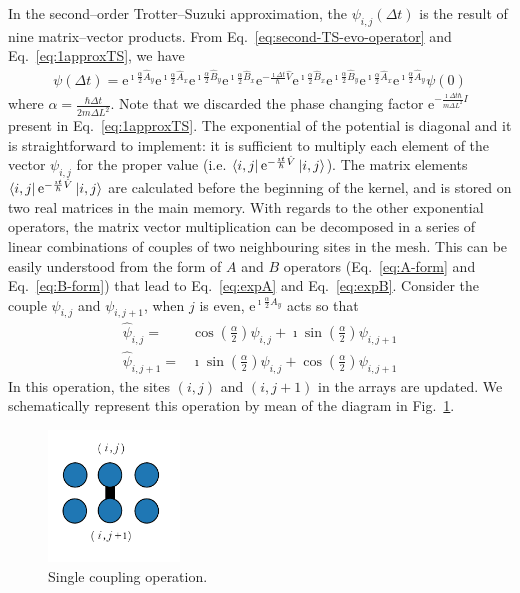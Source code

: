 In the second--order Trotter--Suzuki approximation, the $\psi_{i,j}(\Delta t)$ is the result of nine matrix--vector products. From Eq.~\eqref{eq:second-TS-evo-operator} and Eq.~\eqref{eq:1approxTS}, we have
\begin{align} \label{eq:single-iteration}
\psi(\Delta t) = \mathrm{e}^{\imath \frac{\alpha}{2} \hat{A}_y} \mathrm{e}^{\imath \frac{\alpha}{2} \hat{A}_x}   \mathrm{e}^{\imath \frac{\alpha}{2} \hat{B}_y} \mathrm{e}^{\imath \frac{\alpha}{2} \hat{B}_x}  \mathrm{e}^{-\frac{\imath \Delta t}{\hbar}\hat{V}} \mathrm{e}^{\imath \frac{\alpha}{2} \hat{B}_x} \mathrm{e}^{\imath \frac{\alpha}{2} \hat{B}_y} \mathrm{e}^{\imath \frac{\alpha}{2} \hat{A}_x} \mathrm{e}^{\imath \frac{\alpha}{2} \hat{A}_y} \psi(0)
\end{align}
where $\alpha = \frac{\hbar \Delta t}{2m\Delta L^2}$. Note that we discarded the phase changing factor $\mathrm{e}^{-\frac{\imath \Delta t \hbar}{m \Delta L^2} I}$ present in Eq.~\eqref{eq:1approxTS}. The exponential of the potential is diagonal and it is straightforward to implement: it is sufficient to multiply each element of the vector $\psi_{i,j}$ for the proper value (i.e. $\bra{i,j} \mathrm{e}^{-\frac{\imath t}{\hbar} \hat{V}} \ket{i,j}$). The matrix elements $\bra{i,j} \mathrm{e}^{-\frac{\imath t}{\hbar} \hat{V}} \ket{i,j}$ are calculated before the beginning of the kernel, and is stored on two real matrices in the main memory. With regards to the other exponential operators, the matrix vector multiplication can be decomposed in a series of linear combinations of couples of two neighbouring sites in the mesh. This can be easily understood from the form of $A$ and $B$ operators (Eq.~\eqref{eq:A-form} and Eq.~\eqref{eq:B-form}) that lead to Eq.~\eqref{eq:expA} and Eq.~\eqref{eq:expB}. Consider the couple $\psi_{i,j}$ and $\psi_{i,j+1}$, when $j$ is even, $\mathrm{e}^{\imath \frac{\alpha}{2} A_y}$ acts so that
\begin{align} \label{eq:single-coupling-operation}
\hat{\psi}_{i,j} = & \cos\left(\frac{\alpha}{2}\right) \psi_{i,j} + \imath \sin\left(\frac{\alpha}{2}\right) \psi_{i,j+1} \nonumber \\ 
\hat{\psi}_{i,j+1} = & \imath\sin\left(\frac{\alpha}{2}\right) \psi_{i,j} + \cos\left(\frac{\alpha}{2}\right) \psi_{i,j+1} 
\end{align}
In this operation, the sites $(i,j)$ and $(i,j+1)$ in the arrays are updated. We schematically represent this operation by mean of the diagram in Fig.~\ref{fig:scheme-single-iteration}.
\begin{figure}
   \centering
   \includegraphics[width=3.5cm]{Figs/Single_couple.pdf} %
   \caption{Single coupling operation.} \label{fig:scheme-single-iteration}
\end{figure}

